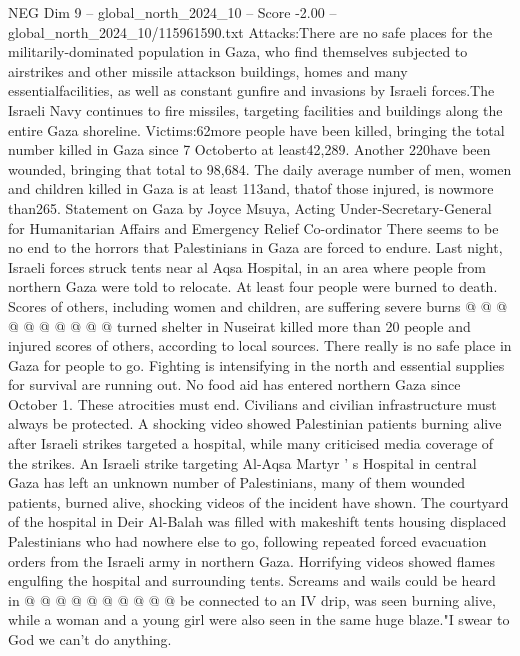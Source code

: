 \begin{textsample}{NEG Dim 9 – global\_north\_2024\_10 – Score -2.00 – global\_north\_2024\_10/115961590.txt}  \label{ex:f9_neg_229}
Attacks:There are no safe places for the militarily-dominated population in Gaza, who find themselves subjected to airstrikes and other missile attackson buildings, homes and many essentialfacilities, as well as constant gunfire and invasions by Israeli forces.The Israeli Navy continues to fire missiles, targeting facilities and buildings along the entire Gaza shoreline.
Victims:62more people have been killed, bringing the total number killed in Gaza since 7 Octoberto at least42,289.
Another 220have been wounded, bringing that total to 98,684.
The daily average number of men, women and children killed in Gaza is at least 113and, thatof those injured, is nowmore than265.
Statement on Gaza by Joyce Msuya, Acting Under-Secretary-General for Humanitarian Affairs and Emergency Relief Co-ordinator There seems to be no end to the horrors that Palestinians in Gaza are forced to endure.
Last night, Israeli forces struck tents near al Aqsa Hospital, in an area where people from northern Gaza were told to relocate.
At least four people were burned to death.
Scores of others, including women and children, are suffering severe burns @ @ @ @ @ @ @ @ @ @ turned shelter in Nuseirat killed more than 20 people and injured scores of others, according to local sources.
There really is no safe place in Gaza for people to go.
Fighting is intensifying in the north and essential supplies for survival are running out.
No food aid has entered northern Gaza since October 1.
These atrocities must end.
Civilians and civilian infrastructure must always be protected.
A shocking video showed Palestinian patients burning alive after Israeli strikes targeted a hospital, while many criticised media coverage of the strikes.
An Israeli strike targeting Al-Aqsa Martyr ' s Hospital in central Gaza has left an unknown number of Palestinians, many of them wounded patients, burned alive, shocking videos of the incident have shown.
The courtyard of the hospital in Deir Al-Balah was filled with makeshift tents housing displaced Palestinians who had nowhere else to go, following repeated forced evacuation orders from the Israeli army in northern Gaza.
Horrifying videos showed flames engulfing the hospital and surrounding tents.
Screams and wails could be heard in @ @ @ @ @ @ @ @ @ @ be connected to an IV drip, was seen burning alive, while a woman and a young girl were also seen in the same huge blaze."I swear to God we can't do anything.

\end{textsample}
